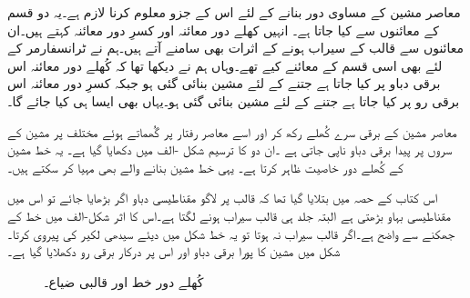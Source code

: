 معاصر مشین کے مساوی دور بنانے کے لئے اس کے جزو معلوم کرنا لازم ہے۔یہ دو قسم کے معائنوں سے کیا جاتا ہے۔ انہیں کھلے دور معائنہ اور کسرِ دور معائنہ کہتے ہیں۔ان معائنوں سے قالب کے سیراب ہونے کے اثرات بھی سامنے آتے ہیں۔ہم نے ٹرانسفارمر کے لئے بھی اسی قسم کے معائنے کیے تھے۔وہاں ہم نے دیکھا تھا کہ کُھلے دور معائنہ اس برقی دباو پر کیا جاتا ہے جتنے کے لئے مشین بنائی گئی ہو جبکہ کسرِ دور معائنہ اس برقی رو پر کیا جاتا ہے جتنے کے لئے مشین بنائی گئی ہو۔یہاں بھی ایسا ہی کیا جائے گا۔ 

معاصر مشین کے برقی سرے کُھلے رکھ کر اور اسے معاصر رفتار پر گُھماتے ہوئے مختلف  پر  مشین کے سروں پر پیدا برقی دباو  ناپی جاتی ہے ۔ان دو کا ترسیم شکل -الف میں دکھایا گیا ہے۔ یہ خط مشین کے کُھلے دور خاصیت ظاہر کرتا ہے۔ یہی خط مشین بنانے والے بھی مہیا کر سکتے ہیں۔

اس کتاب کے حصہ  میں بتلایا گیا تھا کہ قالب پر لاگو مقناطیسی دباو اگر بڑھایا جائے تو اس میں مقناطیسی بہاو بڑھتی ہے البتہ جلد ہی قالب سیراب ہونے لگتا ہے۔اس کا اثر شکل-الف میں خط کے جھکنے سے واضح ہے۔اگر قالب سیراب نہ ہوتا تو یہ خط شکل میں دیئے سیدھی لکیر کی پیروی کرتا۔شکل میں مشین کا پورا برقی دباو اور اس  پر درکار برقی رو  دکھلایا گیا ہے۔
\begin{figure}
\centering
%
\caption{کُھلے دور خط اور قالبی ضیاع۔}
\label{شکل_معاصر_کھلے_دور_خط}
\end{figure}

